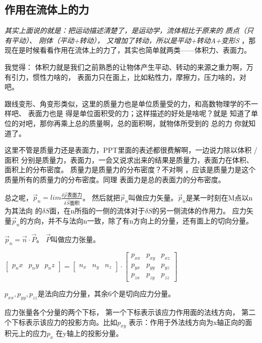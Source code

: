 \documentclass[UTF8,12pt]{article}
\begin{document}
\subsection{作用在流体上的力}

\emph{其实上面说的就是：把运动描述清楚了，是运动学，流体相比于原来的
质点（只有平动）、
刚体（平动+转动），
又增加了转动，所以是平动+转动A+变形S
}，那现在是时候看看作用在流体上的力了，其实也简单就两类——体积力、表面力。

我觉得：
体积力就是我们之前熟悉的让物体产生平动、转动的来源之重力啊，万有引力，惯性力啥的，
表面力只在面上，比如粘性力，摩擦力，压力啥的，对吧。

跟线变形、角变形类似，这里的质量力也是单位质量受的力，和高数物理学的不一样吧、
表面力也是 得是单位面积受的力；这样描述的好处是啥呢？就是
知道了单位的对吧，那你再乘上总的质量啊，总的面积啊，就物体所受到的
总的力 你就知道了。

{\color{red} 这里不管是质量力还是表面力，PPT里面的表述都很费解啊，一边说力除以体积
/面积 分别是质量力，表面力，一会又说求出来的结果是质量力，表面力在体积、面积上的分布密度。
质量力是质量力的分布密度？不对啊 ，应该是质量力是这个质量所有的质量力的分布密度。同理
表面力是总的表面力的分布密度。}

总之呢，$\vec p_n = lim \frac{\delta \vec p 表面力}{\delta \vec S 面积}$。
然后就把$\vec p_n$叫做应力矢量。$\vec p_n$是某一时刻在M点以n为其法向
的$\delta S$面，在n所指的一侧的流体对于$\delta S$的另一侧流体的作用力。
应力矢量$\vec p_n$的方向，并不与法向n一致，除了有n方向上的分量，还有面上的切向分量。

$\vec p_n = \vec n \cdot \vec P$。
$\vec P$叫做应力张量。
\begin{center}
$
\begin{bmatrix}
    p_nx & p_ny & p_nz
\end{bmatrix}
=
\begin{bmatrix}
    n_x & n_y & n_z
\end{bmatrix}
\cdot
\begin{bmatrix}
    p_{xx} & p_{xy} & p_{xz}\\
    p_{yx} & p_{yy} & p_{yz}\\
    p_{zx} & p_{zy} & p_{zz}
\end{bmatrix}
$
\end{center}

$p_{xx}, p_{yy},p_{zz}$是法向应力分量，其余6个是切向应力分量。

应力张量各个分量的两个下标，
第一个下标表示该应力作用面的法线方向，
第二个下标表示该应力的投影方向。比如$p_{xy}$
表示：作用于外法线方向为x轴正向的面积元上的应力$p_x$
在y轴上的投影分量。
\end{document}

